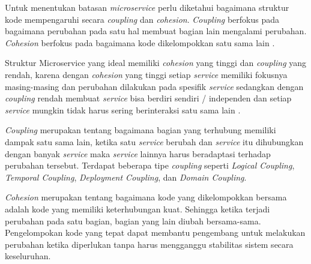Untuk menentukan batasan \textit{microservice} perlu diketahui bagaimana struktur kode mempengaruhi secara \textit{coupling} dan \textit{cohesion}. \textit{Coupling} berfokus pada bagaimana perubahan pada satu hal membuat bagian lain mengalami perubahan. \textit{Cohesion} berfokus pada bagaimana kode dikelompokkan satu sama lain \cite{74C}. 

Struktur Microservice yang ideal memiliki \textit{cohesion} yang tinggi dan \textit{coupling} yang rendah, karena dengan \textit{cohesion} yang tinggi setiap \textit{service} memiliki fokusnya masing-masing dan perubahan dilakukan pada spesifik \textit{service} sedangkan dengan \textit{coupling} rendah membuat \textit{service} bisa berdiri sendiri / independen dan setiap \textit{service} mungkin tidak harus sering berinteraksi satu sama lain \cite{74C}.

\textit{Coupling} merupakan tentang bagaimana bagian yang terhubung memiliki dampak satu sama lain, ketika satu \textit{service} berubah dan \textit{service} itu dihubungkan dengan banyak \textit{service} maka  \textit{service} lainnya harus beradaptasi terhadap perubahan tersebut. Terdapat beberapa tipe \textit{coupling} seperti  \textit{Logical Coupling},  \textit{Temporal Coupling},  \textit{Deployment Coupling}, dan  \textit{Domain Coupling}.

\textit{Cohesion} merupakan tentang bagaimana kode yang dikelompokkan bersama adalah kode yang memiliki keterhubungan kuat. Sehingga ketika terjadi perubahan pada satu bagian, bagian yang lain diubah bersama-sama. Pengelompokan kode yang tepat dapat membantu pengembang untuk melakukan perubahan ketika diperlukan tanpa harus mengganggu stabilitas sistem secara keseluruhan.

